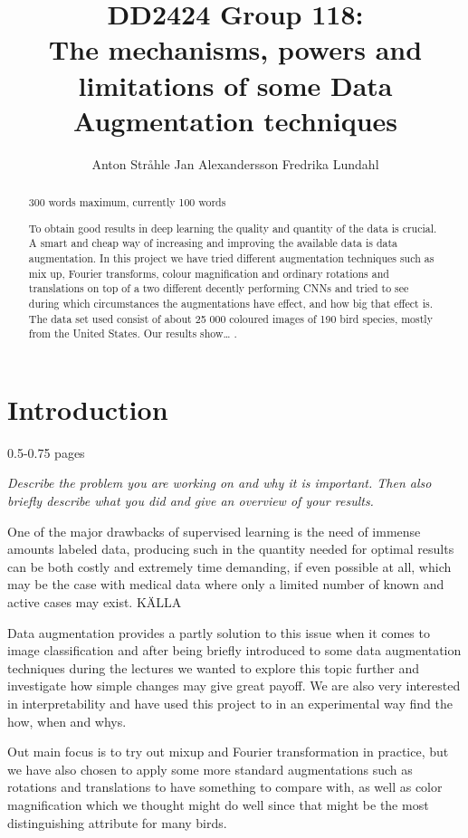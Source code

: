 \documentclass{article}
\title{DD2424 Group 118: \\ The mechanisms, powers and limitations of some Data Augmentation techniques}
\author{%
  Anton Stråhle \And Jan Alexandersson \And Fredrika Lundahl}
\begin{document}
	
\maketitle

\begin{abstract}

300 words maximum, currently 100 words

To obtain good results in deep learning the quality and quantity of the data is crucial. A smart and cheap way of increasing and improving the available data is data augmentation. In this project we have tried different augmentation techniques such as mix up, Fourier transforms, colour magnification and ordinary rotations and translations on top of a two different decently performing CNNs and tried to see during which circumstances the augmentations have effect, and how big that effect is. The data set used consist of about 25 000 coloured images of 190 bird species, mostly from the United States.  Our results show… .


\end{abstract}

\section{Introduction}

0.5-0.75 pages

\textit{Describe the problem you are working on and why it is important. Then also briefly describe what you did and give an overview of your results.}

One of the major drawbacks of supervised learning is the need of immense amounts labeled data, producing such in the quantity needed for optimal results can be both costly and extremely time demanding, if even possible at all, which may be the case with medical data where only a limited number of known and active cases may exist.  KÄLLA

Data augmentation provides a partly solution to this issue when it comes to image classification and after being briefly introduced to some data augmentation techniques during the lectures we wanted to explore this topic further and investigate how simple changes may give great payoff. We are also very interested in interpretability and have used this project to in an experimental way find the how, when and whys. 

Out main focus is to try out mixup and Fourier transformation in practice, but we have also chosen to apply some more standard augmentations such as rotations and translations to have something to compare with, as well as color magnification which we thought might do well since that might be the most distinguishing attribute for many birds.
\end{document}
